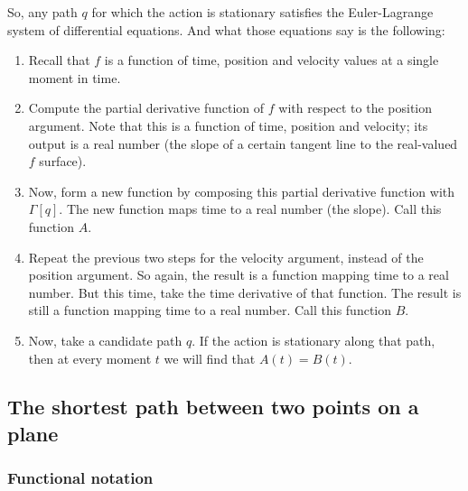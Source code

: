 So, any path $q$ for which the action is stationary satisfies the Euler-Lagrange system of differential equations. And what those equations say is the
following:
\begin{enumerate}
\item Recall that $f$ is a function of time, position and velocity values at a single moment in time.
\item Compute the partial derivative function of $f$ with respect to the position argument. Note that this is a function of time, position and velocity;
  its output is a real number (the slope of a certain tangent line to the real-valued $f$ surface).
\item Now, form a new function by composing this partial derivative function with $\Gamma[q]$. The new function maps time to a real number (the slope). Call
  this function $A$.
\item Repeat the previous two steps for the velocity argument, instead of the position argument. So again, the result is a function mapping time to a real
  number. But this time, take the time derivative of that function. The result is still a function mapping time to a real number. Call this
  function $B$.
\item Now, take a candidate path $q$. If the action is stationary along that path, then at every moment $t$ we will find that $A(t) = B(t)$.
\end{enumerate}

\newpage
\subsection{The shortest path between two points on a plane}

\subsubsection{Functional notation}

